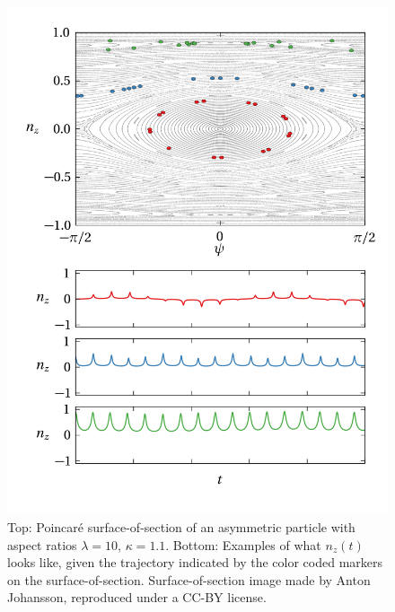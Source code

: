 \documentclass[thesis.tex]{subfiles}
\begin{document}
\begin{figure}
\includegraphics[width=12cm]{figs/poincareB.png}%
\caption{\label{fig:poincareB} Top: Poincar\'e surface-of-section of an asymmetric particle with aspect ratios $\lambda=10$, $\kappa=1.1$. Bottom: Examples of what $n_z(t)$ looks like, given the trajectory indicated by the color coded markers on the surface-of-section. Surface-of-section image made by Anton Johansson, reproduced under a CC-BY license.}%
\end{figure}
\end{document}
